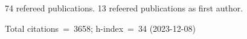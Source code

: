 74 refereed publications. 13 refeered publications as first author.

Total citations~=~3658; h-index~=~34 (2023-12-08)